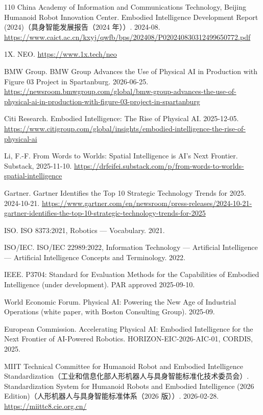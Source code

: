 \documentclass[10pt]{article}
\begin{document}
\begin{thebibliography}{110}
China Academy of Information and Communications Technology, Beijing Humanoid Robot Innovation Center. Embodied Intelligence Development Report (2024)（具身智能发展报告（2024 年））. 2024-08. \url{https://www.caict.ac.cn/kxyj/qwfb/bps/202408/P020240830312499650772.pdf}

1X. NEO. \url{https://www.1x.tech/neo}

BMW Group. BMW Group Advances the Use of Physical AI in Production with Figure 03 Project in Spartanburg. 2026-06-25. \url{https://newsroom.bmwgroup.com/global/bmw-group-advances-the-use-of-physical-ai-in-production-with-figure-03-project-in-spartanburg}

Citi Research. Embodied Intelligence: The Rise of Physical AI. 2025-12-05. \url{https://www.citigroup.com/global/insights/embodied-intelligence-the-rise-of-physical-ai}

Li, F.-F. From Words to Worlds: Spatial Intelligence is AI's Next Frontier. Substack, 2025-11-10. \url{https://drfeifei.substack.com/p/from-words-to-worlds-spatial-intelligence}

Gartner. Gartner Identifies the Top 10 Strategic Technology Trends for 2025. 2024-10-21. \url{https://www.gartner.com/en/newsroom/press-releases/2024-10-21-gartner-identifies-the-top-10-strategic-technology-trends-for-2025}

ISO. ISO 8373:2021, Robotics — Vocabulary. 2021.

ISO/IEC. ISO/IEC 22989:2022, Information Technology — Artificial Intelligence — Artificial Intelligence Concepts and Terminology. 2022.

IEEE. P3704: Standard for Evaluation Methods for the Capabilities of Embodied Intelligence (under development). PAR approved 2025-09-10.

World Economic Forum. Physical AI: Powering the New Age of Industrial Operations (white paper, with Boston Consulting Group). 2025-09.

European Commission. Accelerating Physical AI: Embodied Intelligence for the Next Frontier of AI-Powered Robotics. HORIZON-EIC-2026-AIC-01, CORDIS, 2025.

MIIT Technical Committee for Humanoid Robot and Embodied Intelligence Standardization（工业和信息化部人形机器人与具身智能标准化技术委员会）. Standardization System for Humanoid Robots and Embodied Intelligence (2026 Edition)（人形机器人与具身智能标准体系（2026 版））. 2026-02-28. \url{https://miittc8.cie.org.cn/}


\end{thebibliography}
\end{document}

